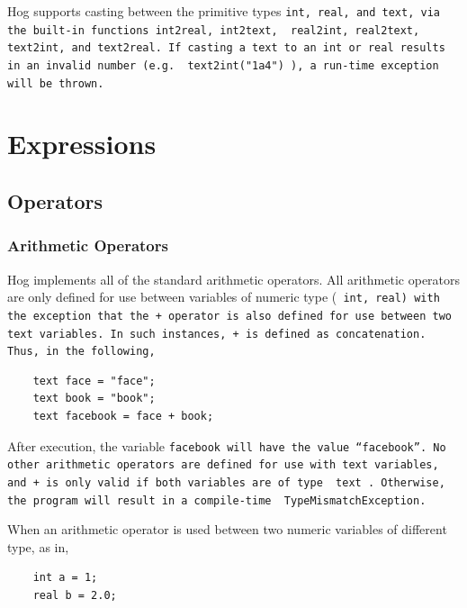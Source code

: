\documentclass{book}
\begin{document}
Hog supports casting between the primitive types \tt int\rm, \tt real\rm, and
\tt text\rm, via the built-in functions \tt int2real\rm, \tt int2text\rm, \tt
real2int\rm, \tt real2text\rm, \tt text2int\rm, and \tt text2real\rm. If
casting a text to an int or real results in an invalid number (e.g. \tt
text2int("1a4") \rm), a run-time exception will be thrown.



\section{Expressions} %
\label{sec:expressions}

\subsection{Operators} %
\label{sub:operators}

\subsubsection{Arithmetic Operators} %
\label{ssub:arithmetic_operators}

Hog implements all of the standard arithmetic operators. All arithmetic
operators are only defined for use between variables of numeric type (\tt
int\rm, \tt real\rm) with the exception that the \tt + \rm operator is also
defined for use between two \tt text \rm variables. In such instances, \tt +
\rm is defined as concatenation. Thus, in the following,

\begin{verbatim}
    text face = "face";
    text book = "book";
    text facebook = face + book;
\end{verbatim}

After execution, the variable \tt facebook \rm will have the value
``facebook''. No other arithmetic operators are defined for use with \tt text
\rm variables, and \tt + \rm is only valid if both variables are of type \tt
text \rm. Otherwise, the program will result in a compile-time \tt
TypeMismatchException\rm. 

When an arithmetic operator is used between two numeric variables of different
type, as in,

\begin{verbatim}
    int a = 1;
    real b = 2.0;
\end{verbatim}
\end{document}
